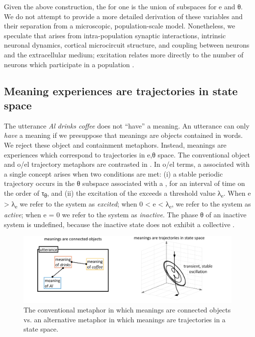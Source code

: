   Given the above construction, the  for one  is the union of subspaces for e and θ. We do not attempt to provide a more detailed derivation of these variables and their separation from a microscopic, population-scale model. Nonetheless, we speculate that  arises from intra-population synaptic interactions, intrinsic neuronal dynamics, cortical microcircuit structure, and coupling between neurons and the extracellular medium; excitation relates more directly to the number of neurons which participate in a population .  

\subsection{Meaning experiences are trajectories in state space}

The utterance \textit{Al drinks coffee} does not “have” a meaning. An utterance can only \textit{have} a meaning if we presuppose that meanings are objects contained in words. We reject these object and containment metaphors. Instead, meanings are experiences which correspond to trajectories in  e,θ space. The conventional object and o/el trajectory metaphors are contrasted in {}. In o/el terms, a  associated with a single concept arises when two conditions are met: (i) a stable periodic trajectory occurs in the θ subspace associated with a , for an interval of time on the order of τ\textsubscript{θ}, and (ii) the excitation of the  exceeds a threshold value λ\textsubscript{e}. When e > λ\textsubscript{e} we refer to the system as \textit{excited}; when 0 < e < λ\textsubscript{e}, we refer to the system as \textit{active}; when e = 0 we refer to the system as \textit{inactive}. The phase θ of an inactive system is undefined, because the inactive state does not exhibit a collective . 

  
\begin{figure}
\includegraphics[width=\textwidth]{figures/Tilsen-img13.png}
\caption{The conventional metaphor in which meanings are connected objects vs. an alternative metaphor in which meanings are trajectories in a state space.}
\label{fig:2:6}
\end{figure}
 

